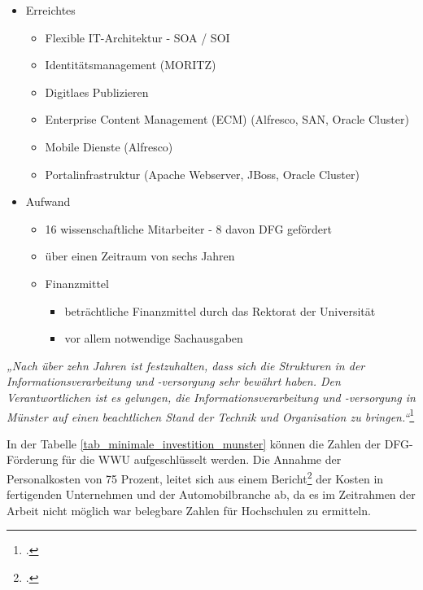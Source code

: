 
\begin{itemize}
	\item Erreichtes
	\begin{itemize}
		\item Flexible IT-Architektur - SOA / SOI
		\item Identitätsmanagement (MORITZ)
		\item Digitlaes Publizieren
		\item Enterprise Content Management (ECM) (Alfresco, SAN, Oracle Cluster)
		\item Mobile Dienste (Alfresco)
		\item Portalinfrastruktur (Apache Webserver, JBoss, Oracle Cluster)
	\end{itemize}
\end{itemize}

		
\begin{itemize}	
	\item Aufwand
	\begin{itemize}
		\item 16 wissenschaftliche Mitarbeiter - 8 davon DFG gefördert
		\item über einen Zeitraum von sechs Jahren
		\item Finanzmittel
		\begin{itemize}
			\item beträchtliche Finanzmittel durch das Rektorat der Universität
			\item vor allem notwendige Sachausgaben
		\end{itemize}
	\end{itemize}
\end{itemize}

\textit{„Nach über zehn Jahren ist festzuhalten, dass sich die Strukturen in der Informationsverarbeitung und -versorgung sehr bewährt haben. Den Verantwortlichen ist es gelungen, die Informationsverarbeitung und -versorgung in Münster auf einen beachtlichen Stand der Technik und Organisation zu bringen.“}\footcite{bode_informationsmanagement_2010}


In der Tabelle \ref{tab_minimale_investition_munster} können die Zahlen der DFG-Förderung für die WWU aufgeschlüsselt werden.
Die Annahme der Personalkosten von 75 Prozent, leitet sich aus einem Bericht\footcite{schuelein_2009} der Kosten in fertigenden Unternehmen und der Automobilbranche ab, da es im Zeitrahmen der Arbeit nicht möglich war belegbare Zahlen für Hochschulen zu ermitteln. 

